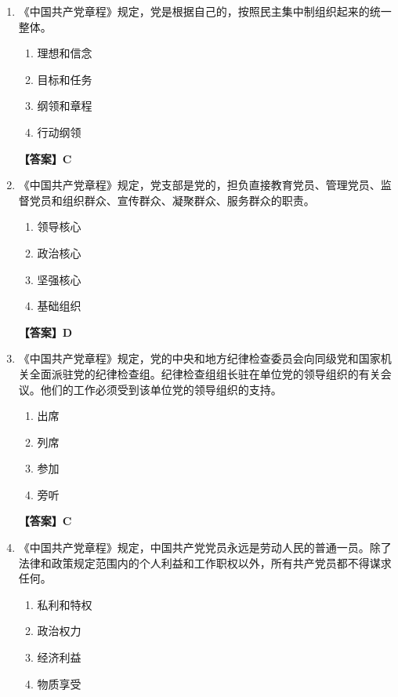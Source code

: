 \documentclass[UTF8,11pt,a4paper]{ctexart}
\begin{document}
\begin{enumerate}[label=\textbf{\arabic*.}, leftmargin=2.5em, itemsep=0.7em]
\textbf{【答案】C}
\item 《中国共产党章程》规定，党是根据自己的\allowbreak\underline{\hspace{4em}}，按照民主集中制组织起来的统一整体。
\begin{enumerate}[label=\Alph*., leftmargin=2em, itemsep=0.1em, topsep=0.15em]
\item 理想和信念
\item 目标和任务
\item 纲领和章程
\item 行动纲领
\end{enumerate}
\textbf{【答案】C}
\item 《中国共产党章程》规定，党支部是党的\allowbreak\underline{\hspace{4em}}，担负直接教育党员、管理党员、监督党员和组织群众、宣传群众、凝聚群众、服务群众的职责。
\begin{enumerate}[label=\Alph*., leftmargin=2em, itemsep=0.1em, topsep=0.15em]
\item 领导核心
\item 政治核心
\item 坚强核心
\item 基础组织
\end{enumerate}
\textbf{【答案】D}
\item 《中国共产党章程》规定，党的中央和地方纪律检查委员会向同级党和国家机关全面派驻党的纪律检查组。纪律检查组组长\allowbreak\underline{\hspace{4em}}驻在单位党的领导组织的有关会议。他们的工作必须受到该单位党的领导组织的支持。
\begin{enumerate}[label=\Alph*., leftmargin=2em, itemsep=0.1em, topsep=0.15em]
\item 出席
\item 列席
\item 参加
\item 旁听
\end{enumerate}
\textbf{【答案】C}
\item 《中国共产党章程》规定，中国共产党党员永远是劳动人民的普通一员。除了法律和政策规定范围内的个人利益和工作职权以外，所有共产党员都不得谋求任何\allowbreak\underline{\hspace{4em}}。
\begin{enumerate}[label=\Alph*., leftmargin=2em, itemsep=0.1em, topsep=0.15em]
\item 私利和特权
\item 政治权力
\item 经济利益
\item 物质享受

\end{enumerate}
\end{enumerate}
\end{document}
